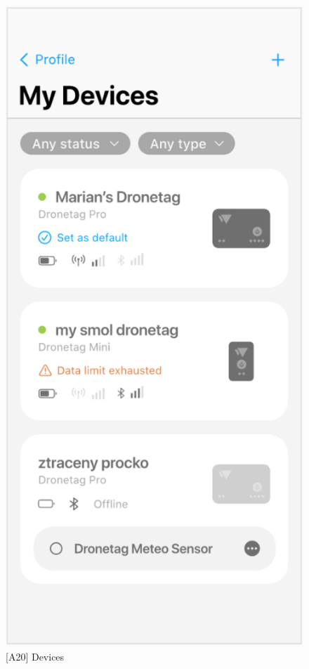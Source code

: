 \begin{figure}
    \centering
    \begin{minipage}{.45\textwidth}
        \centering
        \includegraphics[width=.7\linewidth]{assets/user_interface_design/device/devices.png}
        \caption{[A20] Devices}
        \label{fig:devices}
    \end{minipage}%
    \hspace{.05\linewidth}
    \begin{minipage}{.45\textwidth}
        \centering

\end{minipage}
\end{figure}
